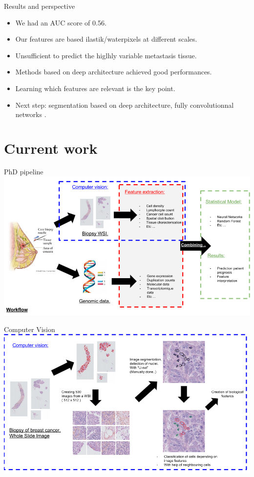 \documentclass{beamer}
\begin{document}
\begin{frame}{Results and perspective}
\begin{itemize}
\item We had an AUC score of 0.56.
\item Our features are based ilastik/waterpixels at different scales.
\item Unsufficient to predict the higlhly variable metastasis tissue.
\item Methods based on deep architecture achieved good performances.
\item Learning which features are relevant is the key point.
\item Next step: segmentation based on deep architecture, fully convolutionnal networks \cite{FCN}.
\end{itemize}
\end{frame}


\section{Current work}

\begin{frame}{PhD pipeline}
\includegraphics[width=\textwidth]{Workflow_overview.png}
\end{frame}
\begin{frame}{Computer Vision}
\includegraphics[width=\textwidth]{ComputerVision.png}
\end{frame}
\end{document}
